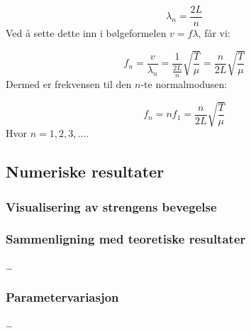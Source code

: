 \begin{equation*}
    \lambda_n = \frac{2L}{n}
\end{equation*}
Ved å sette dette inn i bølgeformelen $v = f \lambda$, får vi:

\begin{equation*}
    f_n = \frac{v}{\lambda_n} = \frac{1}{\frac{2L}{n}} \sqrt{\frac{T}{\mu}} = \frac{n}{2L} \sqrt{\frac{T}{\mu}}
\end{equation*}
Dermed er frekvensen til den $n$-te normalmodusen:

\begin{equation*}
    f_n = n f_1 = \frac{n}{2L} \sqrt{\frac{T}{\mu}}
\end{equation*}
Hvor $n = 1, 2, 3, \ldots$.




\subsection{Numeriske resultater}
\subsubsection{Visualisering av strengens bevegelse}
\begin{figure}[h!]
\centering
{}
\end{figure}




\subsubsection{Sammenligning med teoretiske resultater}
\dots

\subsubsection{Parametervariasjon}
\dots